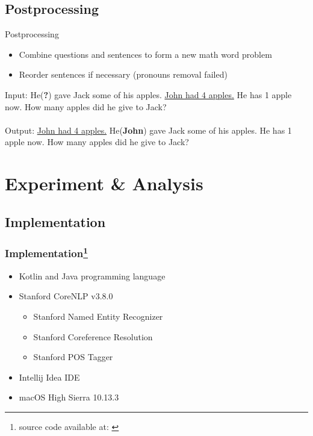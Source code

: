 \documentclass[11pt]{beamer}
\begin{document}
\subsection{Postprocessing}
\begin{frame}{Postprocessing}
    \begin{itemize}
    \item Combine questions and sentences to form a new math word problem
    \item Reorder sentences if necessary (pronouns removal failed)
    \end{itemize}
    \begin{example}
    Input: He(\textbf{?}) gave Jack some of his apples. \underline{John had 4 apples.} He has 1 apple now. How many apples did he give to Jack?\\
    \\
    Output: \underline{John had 4 apples.} He(\textbf{John}) gave Jack some of his apples. He has 1 apple now. How many apples did he give to Jack?\\
    \end{example}
\end{frame}

\section{Experiment \& Analysis}

\subsection{Implementation}
\begin{frame}
    \frametitle{Implementation\footnote[frame,1]{source code available at: \href{https://github.com/xiaoyuin/ProjectMathWordProblemGeneration}{}}}
    \begin{itemize}
    \item Kotlin and Java programming language
    \item Stanford CoreNLP v3.8.0 
    \begin{itemize}
        \item Stanford Named Entity Recognizer
        \item Stanford Coreference Resolution
        \item Stanford POS Tagger
    \end{itemize}
    \item Intellij Idea IDE
    \item macOS High Sierra 10.13.3
    \end{itemize}
\end{frame}
\end{document}
